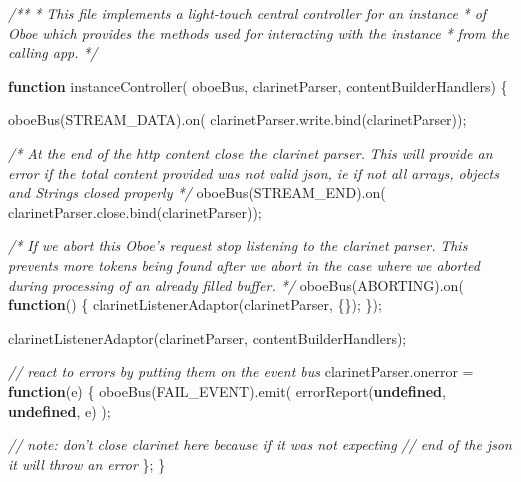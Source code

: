 \documentclass[12pt, ]{article}
\newenvironment{Shaded}{}{}
\newcommand{\KeywordTok}[1]{\textcolor[rgb]{0.00,0.44,0.13}{\textbf{{#1}}}}
\newcommand{\CommentTok}[1]{\textcolor[rgb]{0.38,0.63,0.69}{\textit{{#1}}}}
\newcommand{\OtherTok}[1]{\textcolor[rgb]{0.00,0.44,0.13}{{#1}}}
\newcommand{\FunctionTok}[1]{\textcolor[rgb]{0.02,0.16,0.49}{{#1}}}
\newcommand{\NormalTok}[1]{{#1}}
\begin{document}
\begin{Shaded}
\begin{Highlighting}[]
\CommentTok{/**}
\CommentTok{ * This file implements a light-touch central controller for an instance }
\CommentTok{ * of Oboe which provides the methods used for interacting with the instance }
\CommentTok{ * from the calling app.}
\CommentTok{ */}
 
 
\KeywordTok{function} \FunctionTok{instanceController}\NormalTok{(  oboeBus, }
                              \NormalTok{clarinetParser, contentBuilderHandlers) \{}
                                
   \FunctionTok{oboeBus}\NormalTok{(STREAM_DATA).}\FunctionTok{on}\NormalTok{( }\OtherTok{clarinetParser}\NormalTok{.}\OtherTok{write}\NormalTok{.}\FunctionTok{bind}\NormalTok{(clarinetParser));      }
   
   \CommentTok{/* At the end of the http content close the clarinet parser.}
\CommentTok{      This will provide an error if the total content provided was not }
\CommentTok{      valid json, ie if not all arrays, objects and Strings closed properly */}
   \FunctionTok{oboeBus}\NormalTok{(STREAM_END).}\FunctionTok{on}\NormalTok{( }\OtherTok{clarinetParser}\NormalTok{.}\OtherTok{close}\NormalTok{.}\FunctionTok{bind}\NormalTok{(clarinetParser));}
   

   \CommentTok{/* If we abort this Oboe's request stop listening to the clarinet parser. }
\CommentTok{      This prevents more tokens being found after we abort in the case where }
\CommentTok{      we aborted during processing of an already filled buffer. */}
   \FunctionTok{oboeBus}\NormalTok{(ABORTING).}\FunctionTok{on}\NormalTok{( }\KeywordTok{function}\NormalTok{() \{}
      \FunctionTok{clarinetListenerAdaptor}\NormalTok{(clarinetParser, \{\});}
   \NormalTok{\});   }

   \FunctionTok{clarinetListenerAdaptor}\NormalTok{(clarinetParser, contentBuilderHandlers);}
  
   \CommentTok{// react to errors by putting them on the event bus}
   \OtherTok{clarinetParser}\NormalTok{.}\FunctionTok{onerror} \NormalTok{= }\KeywordTok{function}\NormalTok{(e) \{          }
      \FunctionTok{oboeBus}\NormalTok{(FAIL_EVENT).}\FunctionTok{emit}\NormalTok{(          }
         \FunctionTok{errorReport}\NormalTok{(}\KeywordTok{undefined}\NormalTok{, }\KeywordTok{undefined}\NormalTok{, e)}
      \NormalTok{);}
      
      \CommentTok{// note: don't close clarinet here because if it was not expecting}
      \CommentTok{// end of the json it will throw an error}
   \NormalTok{\};   }
\NormalTok{\}}
\end{Highlighting}
\end{Shaded}
\end{document}
